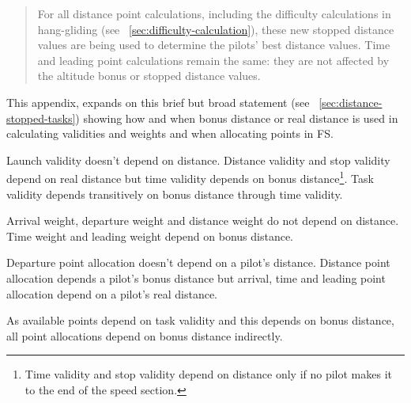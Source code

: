\documentclass[gap.tex]{subfiles}
\begin{document}
\label{sec:bonus-distance-use}

\begin{quote}
    For all distance point calculations, including the difficulty calculations
    in hang-gliding (see ~\ref{sec:difficulty-calculation}), these new stopped
    distance values are being used to determine the pilots’ best distance
    values.  Time and leading point calculations remain the same: they are not
    affected by the altitude bonus or stopped distance values. 
\end{quote}

This appendix, expands on this brief but broad statement (see
~\ref{sec:distance-stopped-tasks}) showing how and when bonus distance or real
distance is used in calculating validities and weights and when allocating
points in FS.

Launch validity doesn't depend on distance. Distance validity and stop validity
depend on real distance but time validity depends on bonus
distance\footnote{Time validity and stop validity depend on distance only if no
pilot makes it to the end of the speed section.\label{fn:repeat}}. Task validity depends
transitively on bonus distance through time validity.

Arrival weight, departure weight and distance weight do not depend on distance.
Time weight and leading weight depend on bonus distance.

Departure point allocation doesn't depend on a pilot's distance. Distance point
allocation depends a pilot's bonus distance but arrival, time and leading point
allocation depend on a pilot's real distance.

As available points depend on task validity and this depends on bonus
distance, all point allocations depend on bonus
distance indirectly.
\end{document}
